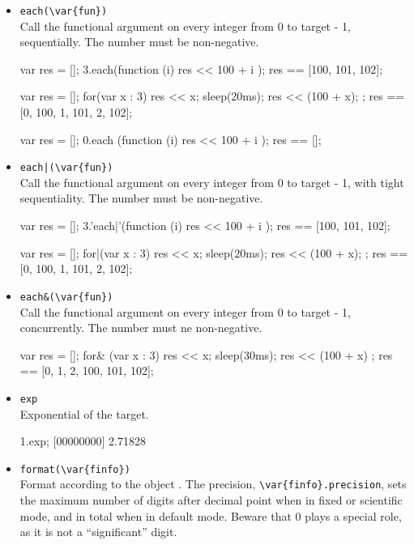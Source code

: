 \begin{itemize}
\item \lstinline|each(\var{fun})|\\
  Call the functional argument  on every integer from 0 to
  target - 1, sequentially.  The number must be non-negative.
\begin{urbiassert}[firstnumber=last]
{
  var res = [];
  3.each(function (i) { res << 100 + i });
  res
}
== [100, 101, 102];

{
  var res = [];
  for(var x : 3) { res << x; sleep(20ms); res << (100 + x); };
  res
}
== [0, 100, 1, 101, 2, 102];

{
  var res = [];
  0.each (function (i) { res << 100 + i });
  res
}
== [];
\end{urbiassert}

\item \lstinline'each|(\var{fun})'\\
  Call the functional argument  on every integer from 0 to
  target - 1, with tight sequentiality.  The number must be
  non-negative.
\begin{urbiassert}[firstnumber=last]
{
  var res = [];
  3.'each|'(function (i) { res << 100 + i });
  res
}
== [100, 101, 102];

{
  var res = [];
  for|(var x : 3) { res << x; sleep(20ms); res << (100 + x); };
  res
}
== [0, 100, 1, 101, 2, 102];
\end{urbiassert}%

\item \lstinline|each&(\var{fun})|\\
  Call the functional argument  on every integer from 0 to
  target - 1, concurrently.  The number must ne non-negative.
\begin{urbiassert}[firstnumber=last]
{
  var res = [];
  for& (var x : 3) { res << x; sleep(30ms); res << (100 + x) };
  res
}
== [0, 1, 2, 100, 101, 102];
\end{urbiassert}%

\item \lstinline|exp|\\
  Exponential of the target.
\begin{urbiscript}[firstnumber=last]
1.exp;
[00000000] 2.71828
\end{urbiscript}

\item \lstinline|format(\var{finfo})|\\
  Format according to the  object .
  The precision, \lstinline|\var{finfo}.precision|, sets the maximum
  number of digits after decimal point when in fixed or scientific
  mode, and in total when in default mode.  Beware that 0 plays a
  special role, as it is not a ``significant'' digit.


\end{itemize}
